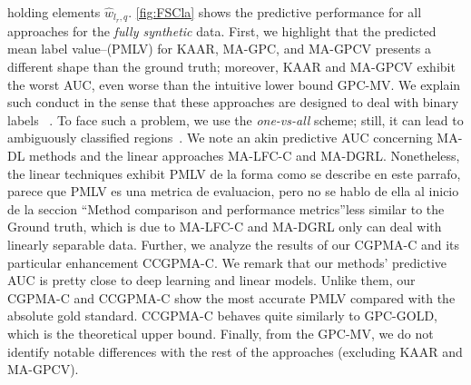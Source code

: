 \documentclass[journal]{IEEEtran}
\newcommand{\comment}[2]{{\color{blue}#1} {\color{red}#2}}
\begin{document}
holding elements $\hat{w}_{l_r,q}$. \cref{fig:FSCla} shows the
predictive performance for all approaches for the \textit{fully
  synthetic} data. First, we highlight that the predicted mean label
value--(PMLV) for KAAR, MA-GPC, and MA-GPCV presents a different shape
than the ground truth; moreover, KAAR and MA-GPCV exhibit the worst
AUC, even worse than the intuitive lower bound GPC-MV. We explain such
conduct in the sense that these approaches are designed to deal with
binary labels
~\cite{gil2018learning,rodrigues2014gaussian,ruiz2019learning}. To
face such a problem, we use the \textit{one-vs-all} scheme; still, it
can lead to ambiguously classified
regions~\cite{bishop2006pattern}. We note an akin predictive AUC
concerning MA-DL methods and the linear approaches MA-LFC-C and
MA-DGRL. Nonetheless, the \comment{linear techniques exhibit PMLV}{de
  la forma como se describe en este parrafo, parece que PMLV es una
  metrica de evaluacion, pero no se hablo de ella al inicio de la
  seccion ``Method comparison and performance metrics''}less similar to the Ground truth, which is due to MA-LFC-C and MA-DGRL only can deal with linearly separable data. Further, we analyze the results of our CGPMA-C and its particular enhancement CCGPMA-C. We remark that our methods' predictive AUC is pretty close to deep learning and linear models. Unlike them, our CGPMA-C and CCGPMA-C show the most accurate PMLV compared with the absolute gold standard. CCGPMA-C behaves quite similarly to GPC-GOLD, which is the theoretical upper bound. Finally, from the GPC-MV, we do not identify notable differences with the rest of the approaches (excluding KAAR and MA-GPCV).
\end{document}
